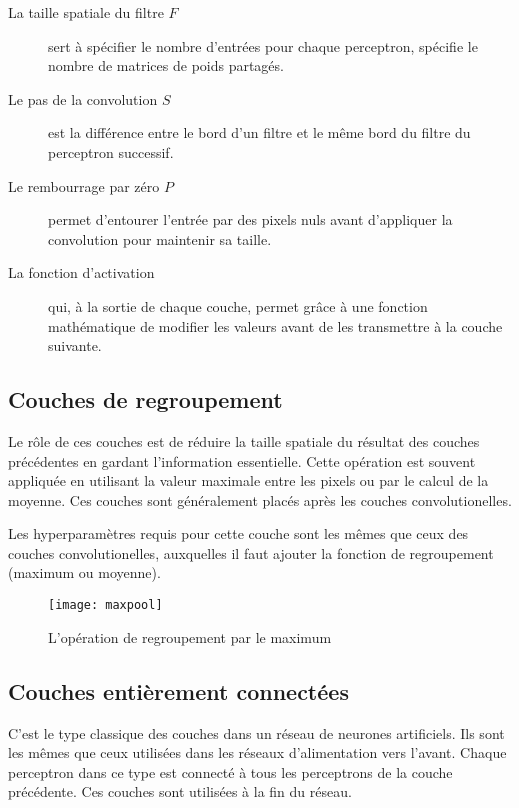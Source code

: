 \begin{description}
  \item[La taille spatiale du filtre $F$] sert à
  spécifier le nombre d'entrées pour chaque perceptron,
   spécifie
  le nombre de matrices de poids partagés.
  \item[Le pas de la convolution $S$] est la différence entre le bord d'un
  filtre et le même bord du filtre du perceptron successif.
  \item[Le rembourrage par zéro $P$] permet d'entourer
  l'entrée par des pixels nuls avant d'appliquer la convolution pour maintenir
  sa taille.
  \item[La fonction d'activation] qui, à la sortie de chaque couche, permet grâce
  à une fonction mathématique de modifier les valeurs avant de les transmettre à la
  couche suivante.
\end{description}

\subsection{Couches de regroupement}

Le rôle de ces couches est de réduire la taille spatiale du résultat des couches
précédentes en gardant l'information essentielle. Cette opération est souvent
appliquée en utilisant la valeur maximale entre les pixels ou par le calcul de
la moyenne. Ces couches sont généralement placés après les couches
convolutionelles.

Les hyperparamètres requis pour cette couche sont les mêmes que ceux des couches
convolutionelles, auxquelles il faut ajouter la fonction de regroupement
(maximum ou moyenne).

\begin{figure}[h]
\begin{center}
\texttt{[image: maxpool]}
\caption{L'opération de regroupement par le maximum}{\cite{karpathy2016cs231n}}
\end{center}
\end{figure}

\subsection{Couches entièrement connectées}

C'est le type classique des couches dans un réseau de neurones artificiels. Ils
sont les mêmes que ceux utilisées dans les réseaux d'alimentation vers l'avant.
Chaque perceptron dans ce type est connecté à tous les perceptrons de la couche
précédente. Ces couches sont utilisées à la fin du réseau.

